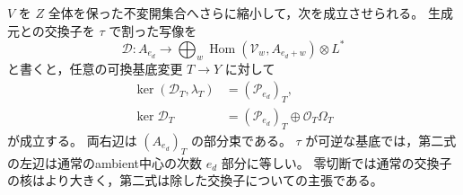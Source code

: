\begin{lemma}[規格化したambient中心の普遍的な核]
\label{lem:normalized-ambient-center-near-zero}
$V$ を $Z$ 全体を保った不変開集合へさらに縮小して，次を成立させられる。
生成元との交換子を $\tau$ で割った写像を
\[
 \mathcal D:A_{e_d}\longrightarrow
   \bigoplus_w\operatorname{Hom}
       (\mathcal V_w,A_{e_d+w})\otimes L^*
\]
と書くと，任意の可換基底変更 $T\to Y$ に対して
\begin{align}
 \ker(\mathcal D_T,\lambda_T)&=(\mathcal P_{e_d})_T,
       \label{eq:normalized-ambient-center-kernel}\\
 \ker\mathcal D_T
       &=(\mathcal P_{e_d})_T\oplus\mathcal O_T\Omega_T
       \label{eq:normalized-ambient-center-splitting}
\end{align}
が成立する。
両右辺は $(A_{e_d})_T$ の部分束である。
$\tau$ が可逆な基底では，第二式の左辺は通常のambient中心の次数 $e_d$ 部分に等しい。
零切断では通常の交換子の核はより大きく，第二式は除した交換子についての主張である。
\end{lemma}
